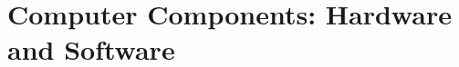 \documentclass[aspectratio=169]{beamer}
\begin{document}
        

\section{Computer Components: Hardware and Software}
\end{document}
